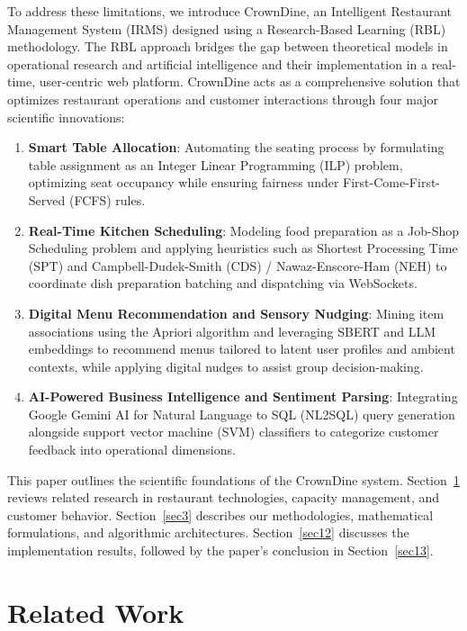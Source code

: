 \documentclass[pdflatex,sn-mathphys-num]{sn-jnl}%
\theoremstyle{thmstyleone}%
\theoremstyle{thmstyletwo}%
\theoremstyle{thmstylethree}%
\begin{document}
To address these limitations, we introduce CrownDine, an Intelligent Restaurant Management System (IRMS) designed using a Research-Based Learning (RBL) methodology. The RBL approach bridges the gap between theoretical models in operational research and artificial intelligence and their implementation in a real-time, user-centric web platform. CrownDine acts as a comprehensive solution that optimizes restaurant operations and customer interactions through four major scientific innovations:
\begin{enumerate}
    \item \textbf{Smart Table Allocation}: Automating the seating process by formulating table assignment as an Integer Linear Programming (ILP) problem, optimizing seat occupancy while ensuring fairness under First-Come-First-Served (FCFS) rules.
    \item \textbf{Real-Time Kitchen Scheduling}: Modeling food preparation as a Job-Shop Scheduling problem and applying heuristics such as Shortest Processing Time (SPT) and Campbell-Dudek-Smith (CDS) / Nawaz-Enscore-Ham (NEH) to coordinate dish preparation batching and dispatching via WebSockets.
    \item \textbf{Digital Menu Recommendation and Sensory Nudging}: Mining item associations using the Apriori algorithm and leveraging SBERT and LLM embeddings to recommend menus tailored to latent user profiles and ambient contexts, while applying digital nudges to assist group decision-making.
    \item \textbf{AI-Powered Business Intelligence and Sentiment Parsing}: Integrating Google Gemini AI for Natural Language to SQL (NL2SQL) query generation alongside support vector machine (SVM) classifiers to categorize customer feedback into operational dimensions.
\end{enumerate}

This paper outlines the scientific foundations of the CrownDine system. Section~\ref{sec2} reviews related research in restaurant technologies, capacity management, and customer behavior. Section~\ref{sec3} describes our methodologies, mathematical formulations, and algorithmic architectures. Section~\ref{sec12} discusses the implementation results, followed by the paper's conclusion in Section~\ref{sec13}.

\section{Related Work}\label{sec2}
\end{document}
